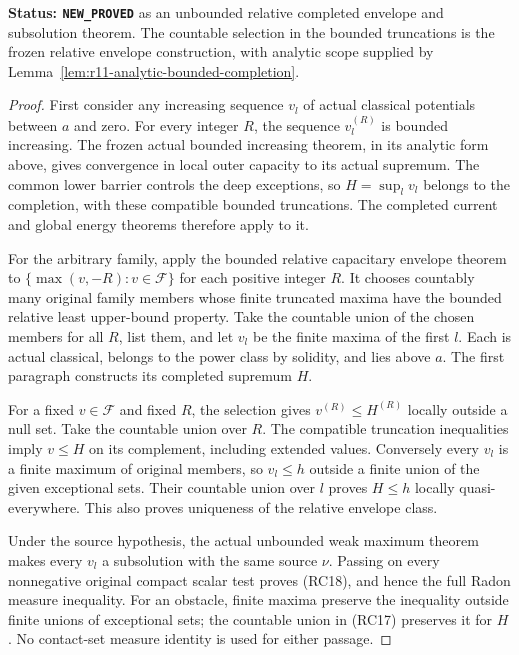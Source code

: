\documentclass[11pt,a4paper]{article}
\numberwithin{equation}{section}
\theoremstyle{definition}
\theoremstyle{remark}
\begin{document}
\noindent\textbf{Status: \texttt{NEW\_PROVED}} as an
unbounded relative completed envelope and subsolution theorem.
The countable selection in the bounded truncations is the
frozen relative envelope construction, with analytic scope
supplied by Lemma~\ref{lem:r11-analytic-bounded-completion}.

\begin{proof}
First consider any increasing sequence $v_l$ of actual
classical potentials between $a$ and zero. For every integer
$R$, the sequence $v_l^{(R)}$ is bounded increasing.
The frozen actual bounded increasing theorem, in its analytic
form above, gives convergence in local outer capacity to its
actual supremum. The common lower barrier controls the deep
exceptions, so $H=\sup_l v_l$ belongs to the completion,
with these compatible bounded truncations. The completed
current and global energy theorems therefore apply to it.

For the arbitrary family, apply the bounded relative
capacitary envelope theorem to
$\{\max(v,-R):v\in\mathscr F\}$ for each positive integer
$R$. It chooses countably many original family members whose
finite truncated maxima have the bounded relative least
upper-bound property. Take the countable union of the chosen
members for all $R$, list them, and let $v_l$ be the finite
maxima of the first $l$. Each is actual classical, belongs
to the power class by solidity, and lies above $a$.
The first paragraph constructs its completed supremum $H$.

For a fixed $v\in\mathscr F$ and fixed $R$, the selection
gives $v^{(R)}\leq H^{(R)}$ locally outside a null set.
Take the countable union over $R$. The compatible truncation
inequalities imply $v\leq H$ on its complement, including
extended values. Conversely every $v_l$ is a finite maximum
of original members, so $v_l\leq h$ outside a finite union
of the given exceptional sets. Their countable union over
$l$ proves $H\leq h$ locally quasi-everywhere. This also
proves uniqueness of the relative envelope class.

Under the source hypothesis, the actual unbounded weak
maximum theorem makes every $v_l$ a subsolution with the
same source $\nu$. Passing on every nonnegative original
compact scalar test proves (RC18), and hence the full Radon
measure inequality. For an obstacle, finite maxima preserve
the inequality outside finite unions of exceptional sets;
the countable union in (RC17) preserves it for $H$.
No contact-set measure identity is used for either passage.
\end{proof}
\end{document}
